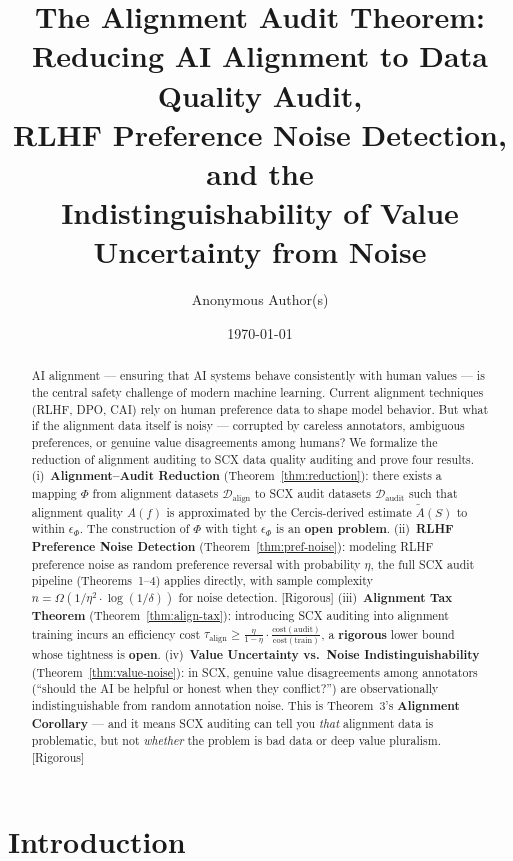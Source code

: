 \documentclass[12pt,a4paper]{article}
\title{\bfseries The Alignment Audit Theorem:\\
Reducing AI Alignment to Data Quality Audit,\\
RLHF Preference Noise Detection, and the\\
Indistinguishability of Value Uncertainty from Noise}
\author{Anonymous Author(s)}
\date{\today}
\newcommand{\rigorous}{\textcolor{green!50!black}{\small\textsf{[Rigorous]}}}
\newcommand{\cD}{\mathcal{D}}
\begin{document}
\maketitle

\begin{abstract}
AI alignment — ensuring that AI systems behave consistently with human values —
is the central safety challenge of modern machine learning.  Current alignment
techniques (RLHF, DPO, CAI) rely on human preference data to shape model
behavior.  But what if the alignment data itself is noisy — corrupted by
careless annotators, ambiguous preferences, or genuine value disagreements
among humans?  We formalize the reduction of alignment auditing to SCX data
quality auditing and prove four results.  (i)~\textbf{Alignment--Audit Reduction}
(Theorem~\ref{thm:reduction}): there exists a mapping $\Phi$ from alignment
datasets $\cD_{\mathrm{align}}$ to SCX audit datasets $\cD_{\mathrm{audit}}$
such that alignment quality $A(f)$ is approximated by the Cercis-derived
estimate $\tilde{A}(S)$ to within $\epsilon_\Phi$.  The construction of $\Phi$
with tight $\epsilon_\Phi$ is an \textbf{open problem}.  (ii)~\textbf{RLHF
Preference Noise Detection} (Theorem~\ref{thm:pref-noise}): modeling RLHF
preference noise as random preference reversal with probability $\eta$, the
full SCX audit pipeline (Theorems~1--4) applies directly, with sample complexity
$n=\Omega(1/\eta^2\cdot\log(1/\delta))$ for noise detection.  \rigorous
(iii)~\textbf{Alignment Tax Theorem} (Theorem~\ref{thm:align-tax}): introducing
SCX auditing into alignment training incurs an efficiency cost
$\tau_{\mathrm{align}}\geq\frac{\eta}{1-\eta}\cdot
\frac{\mathrm{cost}(\mathrm{audit})}{\mathrm{cost}(\mathrm{train})}$, a
\textbf{rigorous} lower bound whose tightness is \textbf{open}.
(iv)~\textbf{Value Uncertainty vs.\ Noise Indistinguishability}
(Theorem~\ref{thm:value-noise}): in SCX, genuine value disagreements among
annotators (``should the AI be helpful or honest when they conflict?'') are
observationally indistinguishable from random annotation noise.  This is
Theorem~3's \textbf{Alignment Corollary} — and it means SCX auditing can tell
you \emph{that} alignment data is problematic, but not \emph{whether} the
problem is bad data or deep value pluralism.  \rigorous
\end{abstract}

\section{Introduction}
\end{document}
